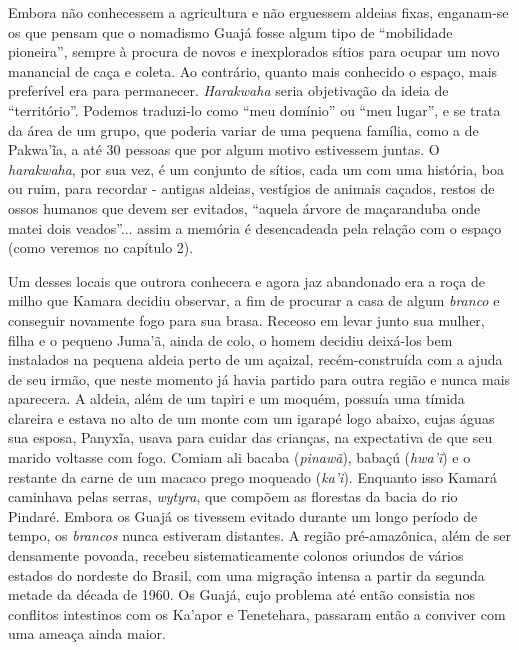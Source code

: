 Embora não conhecessem a agricultura e não erguessem aldeias fixas,
enganam-se os que pensam que o nomadismo Guajá fosse algum tipo de
``mobilidade pioneira'', sempre à procura de novos e inexplorados sítios
para ocupar um novo manancial de caça e coleta. Ao contrário, quanto
mais conhecido o espaço, mais preferível era para permanecer.
\emph{Harakwaha} seria objetivação da ideia de ``território''. Podemos
traduzi-lo como ``meu domínio'' ou ``meu lugar'', e se trata da área de
um grupo, que poderia variar de uma pequena família, como a de Pakwa'ĩa,
a até 30 pessoas que por algum motivo estivessem juntas. O
\emph{harakwaha}, por sua vez, é um conjunto de sítios, cada um com uma
história, boa ou ruim, para recordar - antigas aldeias, vestígios de
animais caçados, restos de ossos humanos que devem ser evitados,
``aquela árvore de maçaranduba onde matei dois veados''... assim a
memória é desencadeada pela relação com o espaço (como veremos no
capítulo 2).

Um desses locais que outrora conhecera e agora jaz abandonado era a roça
de milho que Kamara decidiu observar, a fim de procurar a casa de algum
\emph{branco} e conseguir novamente fogo para sua brasa. Receoso em
levar junto sua mulher, filha e o pequeno Juma'ã, ainda de colo, o homem
decidiu deixá-los bem instalados na pequena aldeia perto de um açaizal,
recém-construída com a ajuda de seu irmão, que neste momento já havia
partido para outra região e nunca mais aparecera. A aldeia, além de um
tapiri e um moquém, possuía uma tímida clareira e estava no alto de um
monte com um igarapé logo abaixo, cujas águas sua esposa, Panyxĩa, usava
para cuidar das crianças, na expectativa de que seu marido voltasse com
fogo. Comiam ali bacaba (\emph{pinawã}), babaçú (\emph{hwa'ĩ}) e o
restante da carne de um macaco prego moqueado (\emph{ka'i}). Enquanto
isso Kamará caminhava pelas serras, \emph{wytyra}, que compõem as
florestas da bacia do rio Pindaré. Embora os Guajá os tivessem evitado
durante um longo período de tempo, os \emph{brancos} nunca estiveram
distantes. A região pré-amazônica, além de ser densamente povoada,
recebeu sistematicamente colonos oriundos de vários estados do nordeste
do Brasil, com uma migração intensa a partir da segunda metade da década
de 1960. Os Guajá, cujo problema até então consistia nos conflitos
intestinos com os Ka'apor e Tenetehara, passaram então a conviver com
uma ameaça ainda maior.

